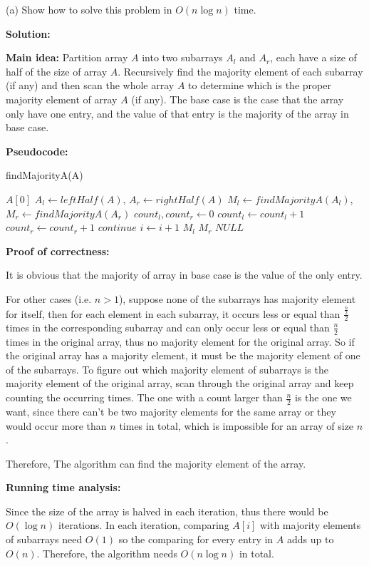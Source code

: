 \documentclass{article}
\begin{document}
(a) Show how to solve this problem in $O(n\log n)$ time.
{\color{blue}\par\textbf{Solution:}
\par\textbf{Main idea: }Partition array $A$ into two subarrays $A_l$ and $A_r$, each have a size of half of the size of array $A$. Recursively find the majority element of each subarray (if any) and then scan the whole array $A$ to determine which is the proper majority element of array $A$ (if any). The base case is the case that the array only have one entry, and the value of that entry is the majority of the array in base case.\\

\par\textbf{Pseudocode:}
\begin{algorithm}
	\caption{findMajorityA(A)}
	\label{alg2}
	\color{blue}
	\begin{algorithmic}
			\RETURN $A[0]$
		\ENDIF
		\STATE $A_l \gets leftHalf(A)$, $A_r \gets rightHalf(A)$
		\STATE $M_l \gets findMajorityA(A_l)$, $M_r \gets findMajorityA(A_r)$
		\STATE $count_l, count_r \gets 0$
				\STATE $count_l \gets count_l + 1$
				\STATE $count_r \gets count_r + 1$
			\ELSE
				\STATE $continue$
			\ENDIF
		\STATE $i \gets i + 1$
		\ENDWHILE
			\RETURN $M_l$
			\RETURN $M_r$
		\ELSE
			\RETURN $NULL$
		\ENDIF
	\end{algorithmic}
\end{algorithm}

\par\textbf{Proof of correctness: }
\par It is obvious that the majority of array in base case is the value of the only entry. 
\par For other cases (i.e. $n > 1$), suppose none of the subarrays has majority element for itself, then for each element in each subarray, it occurs less or equal than $\frac{\frac{n}{2}}{2}$ times in the corresponding subarray and can only occur less or equal than $\frac{n}{2}$ times in the original array, thus no majority element for the original array. So if the original array has a majority element, it must be the majority element of one of the subarrays. To figure out which majority element of subarrays is the majority element of the original array, scan through the original array and keep counting the occurring times. The one with a count larger than $\frac{n}{2}$ is the one we want, since there can't be two majority elements for the same array or they would occur more than $n$ times in total, which is impossible for an array of size $n$.
\par Therefore, The algorithm can find the majority element of the array.\\

\par\textbf{Running time analysis: }
\par Since the size of the array is halved in each iteration, thus there would be $O(\log n)$ iterations. In each iteration, comparing $A[i]$ with majority elements of subarrays need $O(1)$ so the comparing for every entry in $A$ adds up to $O(n)$. Therefore, the algorithm needs $O(n \log n)$ in total.
}
\end{document}
